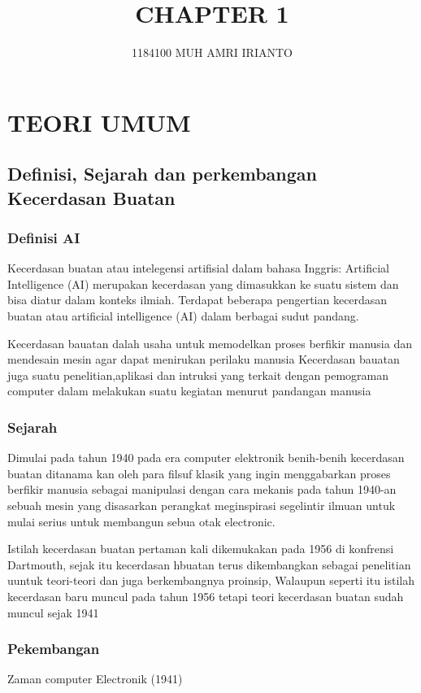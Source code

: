 \documentclass{homework}
\title{CHAPTER 1}
\author{1184100 MUH AMRI IRIANTO}
\begin{document}

\section{TEORI UMUM}
\subsection{ Definisi, Sejarah dan perkembangan Kecerdasan Buatan}
\subsubsection{Definisi AI}
Kecerdasan buatan atau intelegensi artifisial dalam bahasa Inggris: Artificial Intelligence (AI) merupakan kecerdasan yang dimasukkan ke suatu sistem dan bisa diatur dalam konteks ilmiah.
Terdapat beberapa pengertian kecerdasan buatan atau artificial intelligence (AI) dalam berbagai sudut pandang.

\text Kecerdasan bauatan dalah usaha untuk memodelkan proses berfikir manusia dan mendesain mesin agar dapat menirukan perilaku manusia 
Kecerdasan bauatan juga suatu penelitian,aplikasi dan intruksi yang terkait dengan pemograman computer dalam melakukan suatu kegiatan menurut pandangan manusia

\subsubsection{Sejarah}
Dimulai pada tahun 1940 pada era computer elektronik benih-benih kecerdasan buatan ditanama kan oleh para filsuf klasik yang ingin menggabarkan proses berfikir manusia sebagai manipulasi dengan cara mekanis pada tahun 1940-an sebuah mesin yang disasarkan perangkat meginspirasi segelintir ilmuan untuk mulai serius untuk membangun sebua otak electronic.  

Istilah kecerdasan buatan pertaman kali dikemukakan pada 1956 di konfrensi Dartmouth, sejak itu kecerdasan hbuatan terus dikembangkan sebagai penelitian uuntuk teori-teori dan juga berkembangnya proinsip, Walaupun seperti itu istilah kecerdasan baru muncul pada tahun 1956 tetapi teori kecerdasan buatan sudah muncul sejak 1941

\subsubsection{Pekembangan}
Zaman computer Electronik (1941)
\end{document}
